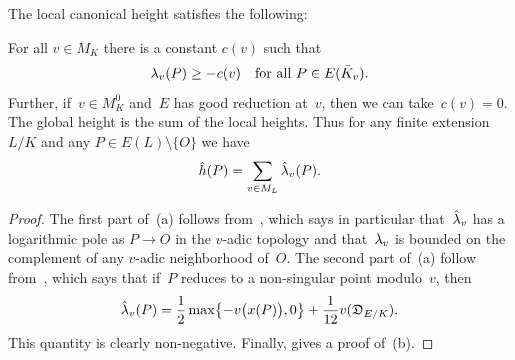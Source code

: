 \documentclass[12pt,reqno]{amsart}
\begin{document}
\begin{proposition}
\label{prop:localhtproperties}
The local canonical height satisfies the following\textup:
\begin{parts}
For all $v\in M_K$ there is a constant $c(v)$ such that
\[
  \lambda_v(P)\ge -c(v)\quad\text{for all $P\in E({\bar K}_v)$.}
\]
Further, if~$v\in M_K^0$ and~$E$ has good reduction at~$v$, then
we can take~$c(v)=0$.
The global height is the sum of the local heights. Thus for any finite
extension $L/K$ and any $P\in E(L)\setminus\{O\}$ we have
\[
  {\hat h}(P) = \sum_{v\in M_L} \hat\lambda_v(P).
\]
\end{parts}
\end{proposition}
\begin{proof}
The first part of~(a) follows from~\cite[Theorem~VI.1.1(a)]{ATAEC}, 
which says in particular that~$\hat\lambda_v$ has a logarithmic pole
as $P\to O$ in the $v$-adic topology and that~$\lambda_v$ is bounded
on the complement of any $v$-adic neighborhood of~$O$. The second
part of~(a) follow from~\cite[Theorem~VI.4.1]{ATAEC}, which says that
if~$P$ reduces to a non-singular point modulo~$v$, then
\[
  \hat\lambda_v(P) = \frac12\max\bigl\{-v\bigl(x(P)\bigr),0\bigr\}
     +\frac1{12}v({\mathfrak{D}}_{E/K}).
\]
This quantity is clearly non-negative.  Finally,
\cite[Theorem~VI.2.1]{ATAEC} gives a proof of~(b).
\end{proof}
\end{document}
